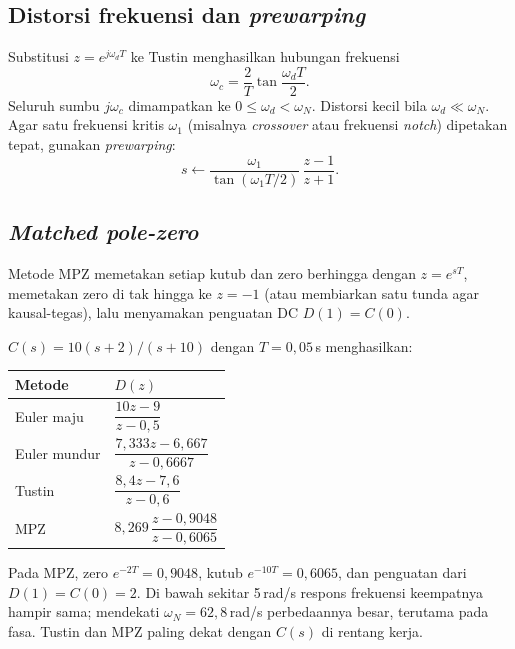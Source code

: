 \subsection{Distorsi frekuensi dan \textit{prewarping}}
Substitusi $z = e^{j\omega_dT}$ ke Tustin menghasilkan hubungan frekuensi
\begin{equation}
	\omega_c = \frac{2}{T}\tan\frac{\omega_dT}{2}.
\end{equation}
Seluruh sumbu $j\omega_c$ dimampatkan ke $0 \le \omega_d < \omega_N$. Distorsi kecil bila $\omega_d \ll \omega_N$. Agar satu frekuensi kritis $\omega_1$ (misalnya \textit{crossover} atau frekuensi \textit{notch}) dipetakan tepat, gunakan \textit{prewarping}:
\begin{equation}
	s \leftarrow \frac{\omega_1}{\tan(\omega_1T/2)}\,\frac{z-1}{z+1}.
\end{equation}

\subsection{\textit{Matched pole-zero}}
Metode MPZ memetakan setiap kutub dan zero berhingga dengan $z = e^{sT}$, memetakan zero di tak hingga ke $z = -1$ (atau membiarkan satu tunda agar kausal-tegas), lalu menyamakan penguatan DC $D(1) = C(0)$.

\begin{contoh}
	$C(s) = 10(s+2)/(s+10)$ dengan $T = 0{,}05$\,s menghasilkan:
	\begin{center}
		\renewcommand{\arraystretch}{2.0}
		\begin{tabular}{@{}l l@{}}
			\toprule
			Metode & $D(z)$ \\
			\midrule
			Euler maju & $\dfrac{10z - 9}{z - 0{,}5}$ \\
			Euler mundur & $\dfrac{7{,}333z - 6{,}667}{z - 0{,}6667}$ \\
			Tustin & $\dfrac{8{,}4z - 7{,}6}{z - 0{,}6}$ \\
			MPZ & $8{,}269\,\dfrac{z - 0{,}9048}{z - 0{,}6065}$ \\
			\bottomrule
		\end{tabular}
	\end{center}
	Pada MPZ, zero $e^{-2T} = 0{,}9048$, kutub $e^{-10T} = 0{,}6065$, dan penguatan dari $D(1) = C(0) = 2$. Di bawah sekitar 5\,rad/s respons frekuensi keempatnya hampir sama; mendekati $\omega_N = 62{,}8$\,rad/s perbedaannya besar, terutama pada fasa. Tustin dan MPZ paling dekat dengan $C(s)$ di rentang kerja.
\end{contoh}

